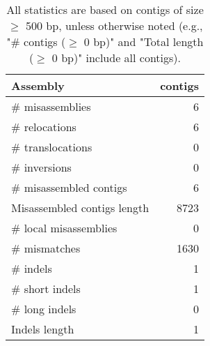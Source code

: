\documentclass[12pt,a4paper]{article}
\begin{document}
\begin{table}[ht]
\begin{center}
\caption{All statistics are based on contigs of size $\geq$ 500 bp, unless otherwise noted (e.g., "\# contigs ($\geq$ 0 bp)" and "Total length ($\geq$ 0 bp)" include all contigs).}
\begin{tabular}{|l*{1}{|r}|}
\hline
Assembly & contigs \\ \hline
\# misassemblies & 6 \\ \hline
\hspace{5mm}\# relocations & 6 \\ \hline
\hspace{5mm}\# translocations & 0 \\ \hline
\hspace{5mm}\# inversions & 0 \\ \hline
\# misassembled contigs & 6 \\ \hline
Misassembled contigs length & 8723 \\ \hline
\# local misassemblies & 0 \\ \hline
\# mismatches & 1630 \\ \hline
\# indels & 1 \\ \hline
\hspace{5mm}\# short indels & 1 \\ \hline
\hspace{5mm}\# long indels & 0 \\ \hline
Indels length & 1 \\ \hline
\end{tabular}
\end{center}
\end{table}
\end{document}
